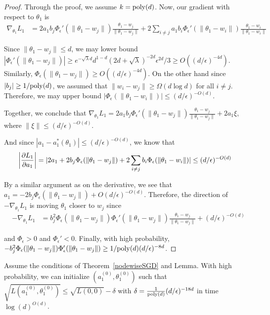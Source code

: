 \begin{proof}
Through the proof, we assume $k = \mathrm{poly}(d)$. Now, our gradient with respect to $\theta_1$ is
%
\begin{align*}
\nabla_{\theta_1} L_1 &= 2a_1b_j \Phi_\epsilon'(\|\theta_1 - w_j\|) \frac{\theta_1 - w_j}{\|\theta_1 - w_j\|}+ 2\sum_{i\neq j} a_1b_i\Phi_\epsilon'(\|\theta_1 - w_i\|) \frac{\theta_1 - w_i}{\|\theta_1 - w_i\|}
\end{align*}
%

Since $\|\theta_1 - w_j\| \leq d$, we may lower bound $|\Phi_\epsilon'(\|\theta_1 - w_j\|)| \geq e^{-\sqrt{\lambda}d}d^{1-d}(2d+\sqrt{\lambda})^{-2d}\epsilon^{2d}/3 \geq O((d/\epsilon)^{-4d})$. Similarly, $\Phi_\epsilon(\|\theta_1 - w_j\|) \geq O((d/\epsilon)^{-4d})$. On the other hand since $|b_j| \geq 1/\mathrm{poly}(d)$, we assumed that $\|w_i - w_j\| \geq \Omega(d \log d)$ for all $i \neq j$. Therefore, we may upper bound $|\Phi_{\epsilon}(\|\theta_1 - w_i\|)| \leq (d/\epsilon)^{-O(d)}$. 

Together, we conclude that $\nabla_{\theta_1} L_1 = 2a_1b_j \Phi_\epsilon'(\|\theta_1 - w_j\|) \frac{\theta_1 - w_j}{\|\theta_1 - w_j\|} + 2a_1\xi$, where $\|\xi\| \leq (d/\epsilon)^{-O(d)}$.

And since $|a_1 - a_1^*(\theta_1)| \leq (d/\epsilon)^{-O(d)}$, we know that
%
\begin{align*}
   \left| \frac{\partial L_1}{\partial a_1} \right| & = \lvert 2a_1 + 2b_j \Phi_\epsilon(\|\theta_1 - w_j\|) + 2\sum_{i \neq j} b_i \Phi_\epsilon(\|\theta_1 - w_i\|) \rvert \leq (d/\epsilon)^{-O(d)}
\end{align*}

By a similar argument as on the derivative, we see that $a_1 = -2b_j \Phi_\epsilon(\|\theta_1 - w_j\|) + O(d/\epsilon)^{-O(d)}$. Therefore, the direction of $-\nabla_{\theta_1} L_1$ is moving $\theta_1$ closer to $w_j$ since 
%
\begin{align*}
-\nabla_{\theta_1} L_1 &=  b_j^2\Phi_\epsilon(\|\theta_1-w_j\|)\Phi_\epsilon'(\|\theta_1 - w_j\|) \frac{\theta_1 - w_j}{\|\theta_1 - w_j\|} + (d/\epsilon)^{-O(d)} 
\end{align*}

and $\Phi_\epsilon > 0$ and $\Phi_\epsilon' < 0$. Finally, with high probability, $-b_j^2\Phi_\epsilon(\|\theta_1-w_j\|)\Phi_\epsilon'(\|\theta_1 - w_j\|) \geq 1/\mathrm{poly}(d)(d/\epsilon)^{-8d}$.
\end{proof}

 
 \begin{lemma}[Initialization]\label{nodeInitialize}
Assume the conditions of Theorem~\ref{nodewiseSGD} and Lemma. With high probability, we can initialize $(a_1^{(0)},\theta_1^{(0)})$ such that $\sqrt{L(a_1^{(0)},\theta_1^{(0)})} \leq \sqrt{L({0,0})} -\delta$ with $\delta = \frac{1}{\mathrm{poly}(d)}(d/\epsilon)^{ -18d}$ in time $\log(d)^{O(d)}$.
 \end{lemma}

